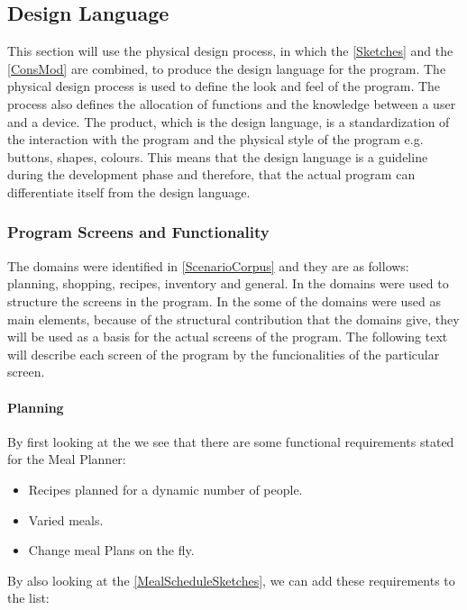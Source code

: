 \subsection{Design Language} \label{DesignLanguage}
This section will use the physical design process, in which the  \cref{Sketches} and the  \cref{ConsMod} are combined, to produce the design language for the program. The physical design process is used to define the look and feel of the program. The process also defines the allocation of functions and the knowledge between a user and a device. The product, which is the design language, is a standardization of the interaction with the program and the physical style of the program e.g. buttons, shapes, colours. This means that the design language is a guideline during the development phase and therefore, that the actual program can differentiate itself from the design language.

\subsubsection{Program Screens and Functionality} \label{ScreensandFunctionality}
The domains were identified in \cref{ScenarioCorpus} and they are as follows: planning, shopping, recipes, inventory and general. In  the domains were used to structure the screens in the program. In the  some of the domains were used as main elements, because of the structural contribution that the domains give, they will be used as a basis for the actual screens of the program. The following text will describe each screen of the program by the funcionalities of the particular screen.

\paragraph{Planning}
By first looking at the  we see that there are some functional requirements stated for the Meal Planner:

\begin{itemize}
\item Recipes planned for a dynamic number of people.
\item Varied meals.
\item Change meal Plans on the fly.
\end{itemize}  

By also looking at the  \cref{MealScheduleSketches}, we can add these requirements to the list:

